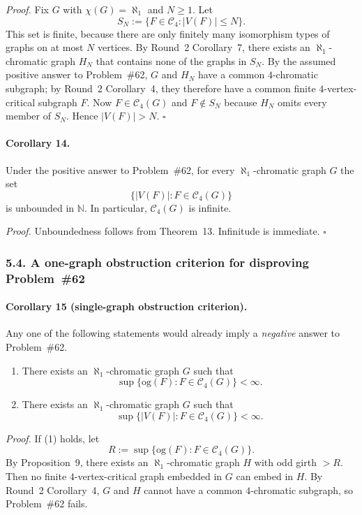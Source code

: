 \emph{Proof.}
Fix $G$ with $\chi(G)=\aleph_1$ and $N\ge 1$.
Let
\[
S_N:=\{F\in \mathcal C_4: |V(F)|\le N\}.
\]
This set is finite, because there are only finitely many isomorphism types of graphs on at most $N$ vertices.
By Round~2 Corollary~7, there exists an $\aleph_1$-chromatic graph $H_N$ that contains none of the graphs in $S_N$.
By the assumed positive answer to Problem~\#62, $G$ and $H_N$ have a common $4$-chromatic subgraph; by Round~2 Corollary~4, they therefore have a common finite $4$-vertex-critical subgraph $F$.
Now $F\in \mathcal C_4(G)$ and $F\notin S_N$ because $H_N$ omits every member of $S_N$.
Hence $|V(F)|>N$.
\hfill$\square$

\paragraph{Corollary 14.}
Under the positive answer to Problem~\#62, for every $\aleph_1$-chromatic graph $G$ the set
\[
\{|V(F)|:F\in \mathcal C_4(G)\}
\]
is unbounded in $\mathbb N$.
In particular, $\mathcal C_4(G)$ is infinite.

\emph{Proof.}
Unboundedness follows from Theorem~13. Infinitude is immediate.
\hfill$\square$

\subsubsection*{5.4. A one-graph obstruction criterion for disproving Problem~\#62}

\paragraph{Corollary 15 (single-graph obstruction criterion).}
Any one of the following statements would already imply a \emph{negative} answer to Problem~\#62.
\begin{enumerate}
\item There exists an $\aleph_1$-chromatic graph $G$ such that
\[
\sup\{\mathrm{og}(F):F\in \mathcal C_4(G)\}<\infty.
\]
\item There exists an $\aleph_1$-chromatic graph $G$ such that
\[
\sup\{|V(F)|:F\in \mathcal C_4(G)\}<\infty.
\]
\end{enumerate}

\emph{Proof.}
If (1) holds, let
\[
R:=\sup\{\mathrm{og}(F):F\in \mathcal C_4(G)\}.
\]
By Proposition~9, there exists an $\aleph_1$-chromatic graph $H$ with odd girth $>R$.
Then no finite $4$-vertex-critical graph embedded in $G$ can embed in $H$.
By Round~2 Corollary~4, $G$ and $H$ cannot have a common $4$-chromatic subgraph, so Problem~\#62 fails.

